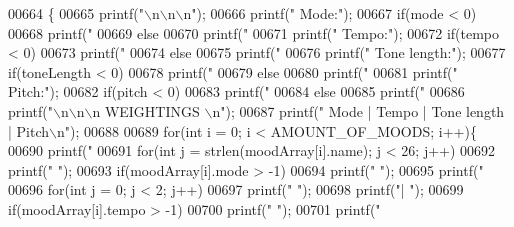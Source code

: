 \begin{DoxyCode}
00664                                                                                                           \{
00665   printf(\textcolor{stringliteral}{"\(\backslash\)n\(\backslash\)n\(\backslash\)n"});
00666   printf(\textcolor{stringliteral}{" Mode:"});
00667   \textcolor{keywordflow}{if}(mode < 0)
00668     printf(\textcolor{stringliteral}{"        %
00669   \textcolor{keywordflow}{else}
00670     printf(\textcolor{stringliteral}{"         %
00671   printf(\textcolor{stringliteral}{" Tempo:"});
00672   \textcolor{keywordflow}{if}(tempo < 0)
00673     printf(\textcolor{stringliteral}{"       %
00674   \textcolor{keywordflow}{else}
00675     printf(\textcolor{stringliteral}{"        %
00676   printf(\textcolor{stringliteral}{" Tone length:"});
00677   \textcolor{keywordflow}{if}(toneLength < 0)
00678     printf(\textcolor{stringliteral}{" %
00679   \textcolor{keywordflow}{else}
00680     printf(\textcolor{stringliteral}{"  %
00681   printf(\textcolor{stringliteral}{" Pitch:"});
00682   \textcolor{keywordflow}{if}(pitch < 0)
00683     printf(\textcolor{stringliteral}{"       %
00684   \textcolor{keywordflow}{else}
00685     printf(\textcolor{stringliteral}{"        %
00686   printf(\textcolor{stringliteral}{"\(\backslash\)n\(\backslash\)n\(\backslash\)n                                       WEIGHTINGS            \(\backslash\)n"});
00687   printf(\textcolor{stringliteral}{"                           Mode | Tempo | Tone length | Pitch\(\backslash\)n"});
00688   
00689   \textcolor{keywordflow}{for}(\textcolor{keywordtype}{int} i = 0; i < AMOUNT_OF_MOODS; i++)\{
00690     printf(\textcolor{stringliteral}{" %
00691     \textcolor{keywordflow}{for}(\textcolor{keywordtype}{int} j = strlen(moodArray[i].name); j < 26; j++)
00692       printf(\textcolor{stringliteral}{" "});
00693     \textcolor{keywordflow}{if}(moodArray[i].mode > -1)
00694       printf(\textcolor{stringliteral}{" "});
00695     printf(\textcolor{stringliteral}{" %
00696     \textcolor{keywordflow}{for}(\textcolor{keywordtype}{int} j = 0; j < 2; j++)
00697       printf(\textcolor{stringliteral}{" "});
00698     printf(\textcolor{stringliteral}{"| "});
00699     \textcolor{keywordflow}{if}(moodArray[i].tempo > -1)
00700       printf(\textcolor{stringliteral}{" "});
00701     printf(\textcolor{stringliteral}{" %
}}}}}}}}}}}
\end{DoxyCode}
